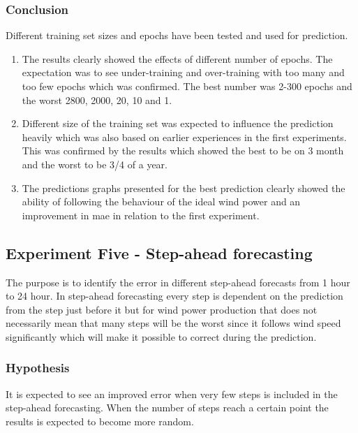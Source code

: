 \subsubsection{Conclusion}
Different training set sizes and epochs have been tested and used for prediction.

\begin{enumerate}
\item The results clearly showed the effects of different number of epochs. The expectation was to see under-training and over-training with too many and too few epochs which was confirmed. The best number was 2-300 epochs and the worst 2800, 2000, 20, 10 and 1.
\item Different size of the training set was expected to influence the prediction heavily which was also based on earlier experiences in the first experiments. This was confirmed by the results which showed the best to be on 3 month and the worst to be 3/4 of a year.
\item The predictions graphs presented for the best prediction clearly showed the ability of following the behaviour of the ideal wind power and an improvement in mae in relation to the first experiment. 
\end{enumerate}

\subsection{Experiment Five - Step-ahead forecasting}
\label{sec:windPowerExperimentFive}
The purpose is to identify the error in different step-ahead forecasts from 1 hour to 24 hour. In step-ahead forecasting every step is dependent on the prediction from the step just before it but for wind power production that does not necessarily mean that many steps will be the worst since it follows wind speed significantly which will make it possible to correct during the prediction.

\subsubsection{Hypothesis}
It is expected to see an improved error when very few steps is included in the step-ahead forecasting. When the number of steps reach a certain point the results is expected to become more random.


